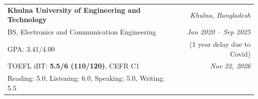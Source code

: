 \begin{tabularx}{\linewidth}{X r}
\textbf{Khulna University of Engineering and Technology} & \textit{Khulna, Bangladesh} \\
BS, Electronics and Communication Engineering & \textit{Jan 2020 -- Sep 2025} \\
GPA: 3.41/4.00 & (1 year delay due to Covid) \\
TOEFL iBT: \textbf{5.5/6 (110/120)}, CEFR C1 & \textit{Nov 22, 2026} \\
Reading: 5.0, Listening: 6.0, Speaking: 5.0, Writing: 5.5 & \\
\end{tabularx}
